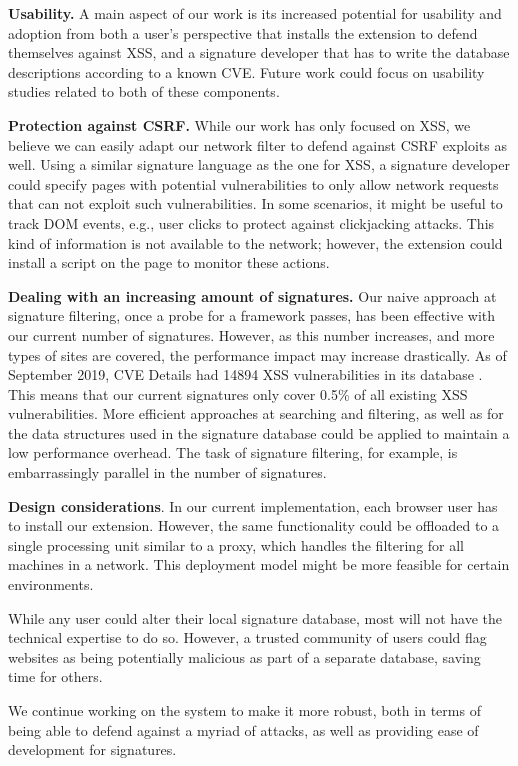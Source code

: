 \textbf{Usability.} A main aspect of our work is its increased potential for usability and adoption from both a user's perspective that installs the extension to defend themselves against \ac{XSS}, and a signature developer that has to write the database descriptions according to a known CVE. Future work could focus on usability studies related to both of these components.

\textbf{Protection against CSRF.} While our work has only focused on \ac{XSS}, we believe we can easily adapt our network filter to defend against CSRF exploits as well. Using a similar signature language as the one for \ac{XSS}, a signature developer could specify pages with potential vulnerabilities to only allow network requests that can not exploit such vulnerabilities. In some scenarios, it might be useful to track DOM events, e.g., user clicks to protect against clickjacking attacks. This kind of information is not available to the network; however, the extension could install a script on the page to monitor these actions. 

\textbf{Dealing with an increasing amount of signatures.} Our naive approach at signature filtering, once a probe for a framework passes, has been effective with our current number of signatures. However, as this number increases, and more types of sites are covered, the performance impact may increase drastically. As of September 2019, CVE Details had 14894 \ac{XSS} vulnerabilities in its database \cite{vulnbytype}. This means that our current signatures only cover 0.5\% of all existing \ac{XSS} vulnerabilities. More efficient approaches at searching and filtering, as well as for the data structures used in the signature database could be applied to maintain a low performance overhead. The task of signature filtering, for example, is embarrassingly parallel in the number of signatures.

\textbf{Design considerations}. In our current implementation, each browser user has to install our extension. However, the same functionality could be offloaded to a single processing unit similar to a proxy, which handles the filtering for all machines in a network. This deployment model might be more feasible for certain environments.

While any user could alter their local signature database, most will not have the technical expertise to do so. However, a trusted community of users could flag websites as being potentially malicious as part of a separate database, saving time for others. 

We continue working on the system to make it more robust, both in terms of being able to defend against a myriad of attacks, as well as providing ease of development for signatures. 
